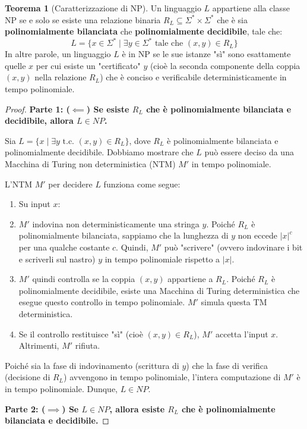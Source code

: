 \documentclass[a4paper]{article}
\theoremstyle{definition} %
\newtheorem{theorem}{Teorema}
\begin{document}
\begin{theorem}[Caratterizzazione di NP]
Un linguaggio $L$ appartiene alla classe NP se e solo se esiste una relazione binaria $R_L \subseteq \Sigma^* \times \Sigma^*$ che è sia \textbf{polinomialmente bilanciata} che \textbf{polinomialmente decidibile}, tale che:
\[ L = \{x \in \Sigma^* \mid \exists y \in \Sigma^* \text{ tale che } (x, y) \in R_L \} \]
In altre parole, un linguaggio $L$ è in NP se le sue istanze "sì" sono esattamente quelle $x$ per cui esiste un "certificato" $y$ (cioè la seconda componente della coppia $(x, y)$ nella relazione $R_L$) che è conciso e verificabile deterministicamente in tempo polinomiale.
\end{theorem}

\begin{proof}
\textbf{Parte 1: ($\impliedby$) Se esiste $R_L$ che è polinomialmente bilanciata e decidibile, allora $L \in NP$.}

Sia $L = \{x \mid \exists y \text{ t.c. } (x, y) \in R_L\}$, dove $R_L$ è polinomialmente bilanciata e polinomialmente decidibile.
Dobbiamo mostrare che $L$ può essere deciso da una Macchina di Turing non deterministica (NTM) $M'$ in tempo polinomiale.

L'NTM $M'$ per decidere $L$ funziona come segue:
\begin{enumerate}
    \item Su input $x$:
    \item $M'$ indovina non deterministicamente una stringa $y$. Poiché $R_L$ è polinomialmente bilanciata, sappiamo che la lunghezza di $y$ non eccede $|x|^c$ per una qualche costante $c$. Quindi, $M'$ può "scrivere" (ovvero indovinare i bit e scriverli sul nastro) $y$ in tempo polinomiale rispetto a $|x|$.
    \item $M'$ quindi controlla se la coppia $(x, y)$ appartiene a $R_L$. Poiché $R_L$ è polinomialmente decidibile, esiste una Macchina di Turing deterministica che esegue questo controllo in tempo polinomiale. $M'$ simula questa TM deterministica.
    \item Se il controllo restituisce "sì" (cioè $(x, y) \in R_L$), $M'$ accetta l'input $x$. Altrimenti, $M'$ rifiuta.
\end{enumerate}
Poiché sia la fase di indovinamento (scrittura di $y$) che la fase di verifica (decisione di $R_L$) avvengono in tempo polinomiale, l'intera computazione di $M'$ è in tempo polinomiale. Dunque, $L \in NP$.

\textbf{Parte 2: ($\implies$) Se $L \in NP$, allora esiste $R_L$ che è polinomialmente bilanciata e decidibile.}


\end{proof}
\end{document}
